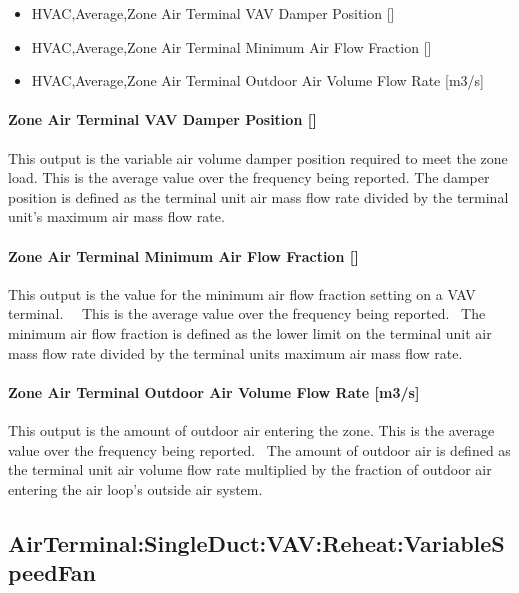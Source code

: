 \begin{itemize}
\item
  HVAC,Average,Zone Air Terminal VAV Damper Position {[]}
\item
  HVAC,Average,Zone Air Terminal Minimum Air Flow Fraction {[]}
\item
  HVAC,Average,Zone Air Terminal Outdoor Air Volume Flow Rate {[}m3/s{]}
\end{itemize}

\paragraph{\texorpdfstring{Zone Air Terminal VAV Damper Position {[]}}{Zone Air Terminal VAV Damper Position }}\label{zone-air-terminal-vav-damper-position}

This output is the variable air volume damper position required to meet the zone load. This is the average value over the frequency being reported. The damper position is defined as the terminal unit air mass flow rate divided by the terminal unit's maximum air mass flow rate.

\paragraph{\texorpdfstring{Zone Air Terminal Minimum Air Flow Fraction {[]}}{Zone Air Terminal Minimum Air Flow Fraction }}\label{zone-air-terminal-minimum-air-flow-fraction}

This output is the value for the minimum air flow fraction setting on a VAV terminal.~~ This is the average value over the frequency being reported.~ The minimum air flow fraction is defined as the lower limit on the terminal unit air mass flow rate divided by the terminal units maximum air mass flow rate.

\paragraph{Zone Air Terminal Outdoor Air Volume Flow Rate {[}m3/s{]}}\label{zone-air-terminal-outdoor-air-volume-flow-rate-m3s}

This output is the amount of outdoor air entering the zone. This is the average value over the frequency being reported.~ The amount of outdoor air is defined as the terminal unit air volume flow rate multiplied by the fraction of outdoor air entering the air loop's outside air system.

\subsection{AirTerminal:SingleDuct:VAV:Reheat:VariableSpeedFan}\label{airterminalsingleductvavreheatvariablespeedfan}

